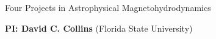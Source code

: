 \documentclass[11pt]{NSF}  %
\begin{document}
\begin{centering}
\begin{LARGE}
    Four Projects in Astrophysical Magnetohydrodynamics
\end{LARGE}

\renewcommand{\section}[1]{\red{#1}}
\vspace{2mm}
{\bf PI: David C. Collins} (Florida State University)

\end{centering}
\pagestyle{plain}

%
%
%



%



\end{document}
